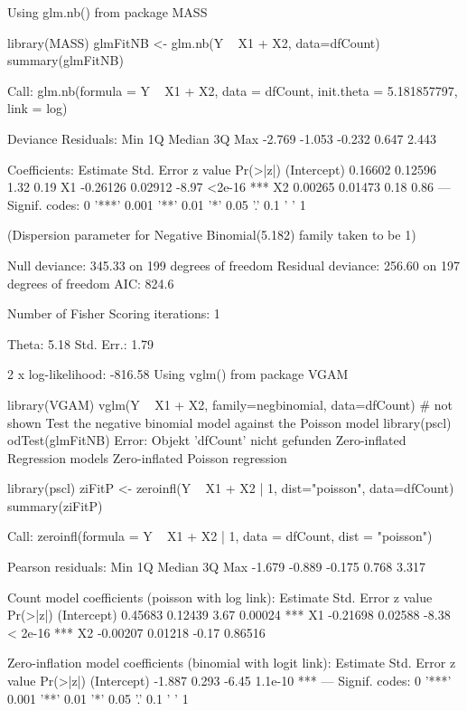 Using glm.nb() from package MASS

library(MASS)
glmFitNB <- glm.nb(Y ~ X1 + X2, data=dfCount)
summary(glmFitNB)

Call:
glm.nb(formula = Y ~ X1 + X2, data = dfCount, init.theta = 5.181857797, 
    link = log)

Deviance Residuals: 
   Min      1Q  Median      3Q     Max  
-2.769  -1.053  -0.232   0.647   2.443  

Coefficients:
            Estimate Std. Error z value Pr(>|z|)    
(Intercept)  0.16602    0.12596    1.32     0.19    
X1          -0.26126    0.02912   -8.97   <2e-16 ***
X2           0.00265    0.01473    0.18     0.86    
---
Signif. codes:  0 '***' 0.001 '**' 0.01 '*' 0.05 '.' 0.1 ' ' 1 

(Dispersion parameter for Negative Binomial(5.182) family taken to be 1)

    Null deviance: 345.33  on 199  degrees of freedom
Residual deviance: 256.60  on 197  degrees of freedom
AIC: 824.6

Number of Fisher Scoring iterations: 1

              Theta:  5.18 
          Std. Err.:  1.79 

 2 x log-likelihood:  -816.58 
Using vglm() from package VGAM

library(VGAM)
vglm(Y ~ X1 + X2, family=negbinomial, data=dfCount)
# not shown
Test the negative binomial model against the Poisson model
library(pscl)
odTest(glmFitNB)
Error: Objekt 'dfCount' nicht gefunden
Zero-inflated Regression models
Zero-inflated Poisson regression

library(pscl)
ziFitP <- zeroinfl(Y ~ X1 + X2 | 1, dist="poisson", data=dfCount)
summary(ziFitP)

Call:
zeroinfl(formula = Y ~ X1 + X2 | 1, data = dfCount, dist = "poisson")

Pearson residuals:
   Min     1Q Median     3Q    Max 
-1.679 -0.889 -0.175  0.768  3.317 

Count model coefficients (poisson with log link):
            Estimate Std. Error z value Pr(>|z|)    
(Intercept)  0.45683    0.12439    3.67  0.00024 ***
X1          -0.21698    0.02588   -8.38  < 2e-16 ***
X2          -0.00207    0.01218   -0.17  0.86516    

Zero-inflation model coefficients (binomial with logit link):
            Estimate Std. Error z value Pr(>|z|)    
(Intercept)   -1.887      0.293   -6.45  1.1e-10 ***
---
Signif. codes:  0 '***' 0.001 '**' 0.01 '*' 0.05 '.' 0.1 ' ' 1 

